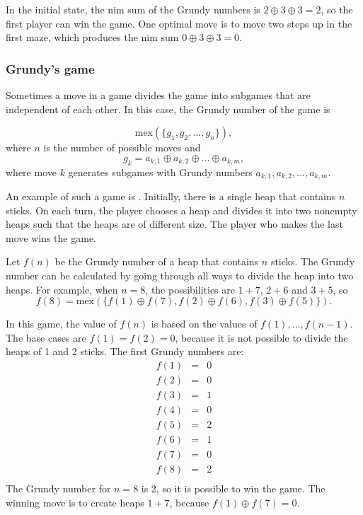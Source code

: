 In the initial state, the nim sum of the Grundy numbers
is $2 \oplus 3 \oplus 3 = 2$, so
the first player can win the game.
One optimal move is to move two steps up
in the first maze, which produces the nim sum
$0 \oplus 3 \oplus 3 = 0$.

\subsubsection{Grundy's game}

Sometimes a move in a game divides the game
into subgames that are independent of each other.
In this case, the Grundy number of the game is

\[\textrm{mex}(\{g_1, g_2, \ldots, g_n \}),\]
where $n$ is the number of possible moves and
\[g_k = a_{k,1} \oplus a_{k,2} \oplus \ldots \oplus a_{k,m},\]
where move $k$ generates subgames with
Grundy numbers $a_{k,1},a_{k,2},\ldots,a_{k,m}$.


An example of such a game is .
Initially, there is a single heap that contains $n$ sticks.
On each turn, the player chooses a heap and divides
it into two nonempty heaps such that the heaps
are of different size.
The player who makes the last move wins the game.

Let $f(n)$ be the Grundy number of a heap
that contains $n$ sticks.
The Grundy number can be calculated by going
through all ways to divide the heap into
two heaps.
For example, when $n=8$, the possibilities
are $1+7$, $2+6$ and $3+5$, so
\[f(8)=\textrm{mex}(\{f(1) \oplus f(7), f(2) \oplus f(6), f(3) \oplus f(5)\}).\]

In this game, the value of $f(n)$ is based on the values
of $f(1),\ldots,f(n-1)$.
The base cases are $f(1)=f(2)=0$,
because it is not possible to divide the heaps
of 1 and 2 sticks.
The first Grundy numbers are:
\[
    \begin{array}{lcl}
        f(1) & = & 0 \\
        f(2) & = & 0 \\
        f(3) & = & 1 \\
        f(4) & = & 0 \\
        f(5) & = & 2 \\
        f(6) & = & 1 \\
        f(7) & = & 0 \\
        f(8) & = & 2 \\
    \end{array}
\]
The Grundy number for $n=8$ is 2,
so it is possible to win the game.
The winning move is to create heaps
$1+7$, because $f(1) \oplus f(7) = 0$.

